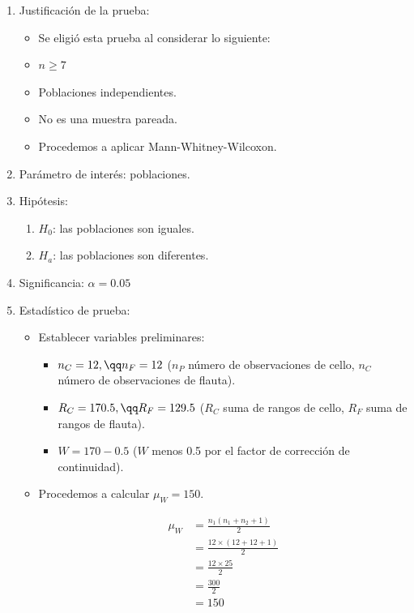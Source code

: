 \begin{enumerate}
    \item Justificación de la prueba:
        \begin{itemize}
            \item Se eligió esta prueba al considerar lo siguiente: 
            \item $n \geq 7$ 
            \item Poblaciones independientes.
            \item No es una muestra pareada.
            \item Procedemos a aplicar Mann-Whitney-Wilcoxon.
        \end{itemize}
    \item Parámetro de interés: poblaciones.
    \item Hipótesis: 
        \begin{enumerate}
            \item $H_0$: las poblaciones son iguales.
            \item $H_a$: las poblaciones son diferentes.
        \end{enumerate}
    
    \item Significancia: $\alpha = 0.05$ 
    \item Estadístico de prueba: 
        \begin{itemize}
            \item Establecer variables preliminares:
                \begin{itemize}
                    \item $n_C = 12, \qq  n_F = 12$ ($n_P$ número de observaciones de cello, $n_C$ número de observaciones de flauta).
                    \item $R_C = 170.5, \qq  R_F = 129.5$ ($R_C$ suma de rangos de cello, $R_F$ suma de rangos de flauta).
                    \item $W = 170 - 0.5$ ($W$ menos 0.5 por el factor de corrección de continuidad).
                \end{itemize}
            
            \item Procedemos a calcular $\mu_W = 150$.
                \begin{center}
                   \begin{align*}
                       \mu_W &= \frac{n_1(n_1+n_2+1)}{2}\\
                       &= \frac{12\times(12 + 12 + 1)}{2} \\ 
                       &= \frac{12\times 25}{2} \\ 
                       &= \frac{300}{2} \\ 
                       &= 150 \\  
                   \end{align*}
                \end{center}


\end{itemize}
\end{enumerate}
